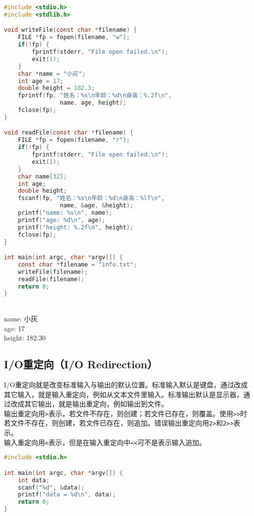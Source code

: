 \begin{lstlisting}[language=C, title=文件I/O]
#include <stdio.h>
#include <stdlib.h>

void writeFile(const char *filename) {
    FILE *fp = fopen(filename, "w");
    if(!fp) {
        fprintf(stderr, "File open failed.\n");
        exit(1);
    }
    char *name = "小灰";
    int age = 17;
    double height = 182.3;
    fprintf(fp, "姓名：%s\n年龄：%d\n身高：%.2f\n", 
                name, age, height);
    fclose(fp);
}

void readFile(const char *filename) {
    FILE *fp = fopen(filename, "r");
    if(!fp) {
        fprintf(stderr, "File open failed.\n");
        exit(1);
    }
    char name[32];
    int age;
    double height;
    fscanf(fp, "姓名：%s\n年龄：%d\n身高：%lf\n", 
                name, &age, &height);
    printf("name: %s\n", name);
    printf("age: %d\n", age);
    printf("height: %.2f\n", height);
    fclose(fp);
}

int main(int argc, char *argv[]) {
    const char *filename = "info.txt";
    writeFile(filename);
    readFile(filename);
    return 0;
}
\end{lstlisting}

\begin{tcolorbox}
     \\
    name: 小灰 \\
    age: 17 \\
    height: 182.30
\end{tcolorbox}

\subsection{I/O重定向（I/O Redirection）}

I/O重定向就是改变标准输入与输出的默认位置。标准输入默认是键盘，通过改成其它输入，就是输入重定向，例如从文本文件里输入。标准输出默认是显示器，通过改成其它输出，就是输出重定向，例如输出到文件。 \\

输出重定向用\lstinline|>|表示，若文件不存在，则创建；若文件已存在，则覆盖。使用\lstinline|>>|时若文件不存在，则创建，若文件已存在，则追加。错误输出重定向用\lstinline|2>|和\lstinline|2>>|表示。 \\

输入重定向用\lstinline|<|表示，但是在输入重定向中\lstinline|<<|可不是表示输入追加。

\begin{lstlisting}[language=C, title=I/O重定向]
#include <stdio.h>

int main(int argc, char *argv[]) {
    int data;
    scanf("%d", &data);
    printf("data = %d\n", data);
    return 0;
}
\end{lstlisting}

